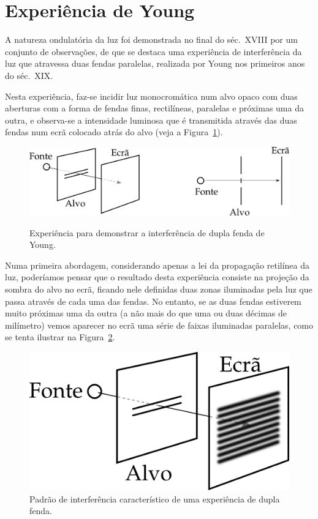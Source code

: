 \section{Experiência de Young}
A natureza ondulatória da luz foi demonstrada no final do séc.~XVIII por um
conjunto de observações, de que se destaca uma experiência de interferência da
luz que atravessa duas fendas paralelas, realizada por Young nos primeiros anos
do séc.~XIX.

Nesta experiência, faz-se incidir luz monocromática num alvo opaco com duas
aberturas com a forma de fendas finas, rectilíneas, paralelas e próximas uma da
outra, e observa-se a intensidade luminosa que é transmitida através das duas
fendas num ecrã colocado atrás do alvo (veja a Figura~\ref{fig:40-020}).
\begin{figure}[htb]
{\centering
\includegraphics{figs/f40-020.png}
}\par
\caption{Experiência para demonstrar a interferência de dupla fenda de Young.
\label{fig:40-020}}
\end{figure}
Numa primeira abordagem, considerando apenas a lei da propagação retilínea da
luz, poderíamos pensar que o resultado desta experiência consiste na projeção
da sombra do alvo no ecrã, ficando nele definidas duas zonas iluminadas pela luz
que passa através de cada uma das fendas. No entanto, se as duas fendas
estiverem muito próximas uma da outra (a não mais do que uma ou duas décimas de
milímetro) vemos aparecer no ecrã uma série de faixas iluminadas paralelas,
como se tenta ilustrar na Figura~\ref{fig:40-030}.
\begin{figure}[htb]
    {\centering
        \includegraphics{figs/f40-030.png}
        \caption{Padrão de interferência característico de uma experiência de
            dupla fenda.\label{fig:40-030}}

    }
\end{figure}
